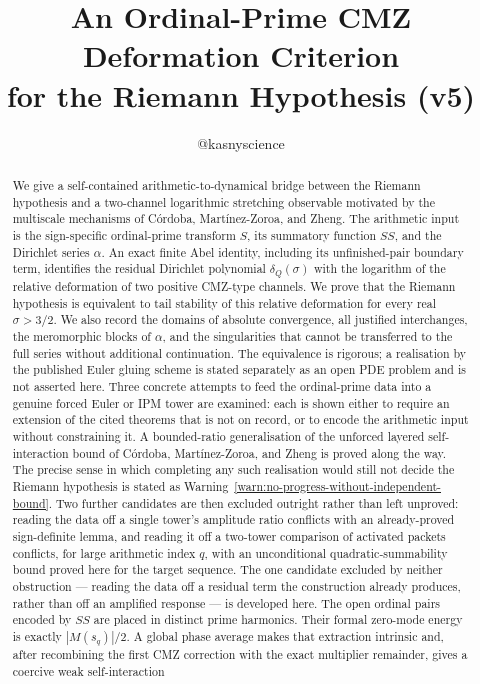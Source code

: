 \documentclass[11pt]{amsart}
\title{An Ordinal-Prime CMZ Deformation Criterion\\
for the Riemann Hypothesis (v5)}
\author{@kasnyscience}
\date{}
\numberwithin{equation}{section}
\theoremstyle{plain}
\theoremstyle{definition}
\theoremstyle{remark}
\begin{document}
\begin{abstract}
We give a self-contained arithmetic-to-dynamical bridge between the Riemann
hypothesis and a two-channel logarithmic stretching observable motivated by
the multiscale mechanisms of C\'ordoba, Mart\'inez-Zoroa, and Zheng.  The
arithmetic input is the sign-specific ordinal-prime transform $S$, its
summatory function $SS$, and the Dirichlet series $\alpha$.  An exact finite
Abel identity, including its unfinished-pair boundary term, identifies the
residual Dirichlet polynomial $\delta_Q(\sigma)$ with the logarithm of the
relative deformation of two positive CMZ-type channels.  We prove that the
Riemann hypothesis is equivalent to tail stability of this relative
deformation for every real $\sigma>3/2$.  We also record the domains of
absolute convergence, all justified interchanges, the meromorphic blocks of
$\alpha$, and the singularities that cannot be transferred to the full
series without additional continuation.  The equivalence is rigorous; a
realisation by the published Euler gluing scheme is stated separately as an
open PDE problem and is not asserted here.  Three concrete attempts to feed
the ordinal-prime data into a genuine forced Euler or IPM tower are examined:
each is shown either to require an extension of the cited theorems that is
not on record, or to encode the arithmetic input without constraining it.  A
bounded-ratio generalisation of the unforced layered self-interaction bound
of C\'ordoba, Mart\'inez-Zoroa, and Zheng is proved along the way.  The
precise sense in which completing any such realisation would still not
decide the Riemann hypothesis is stated as
Warning~\ref{warn:no-progress-without-independent-bound}.  Two further
candidates are then excluded outright rather than left unproved: reading
the data off a single tower's amplitude ratio conflicts with an
already-proved sign-definite lemma, and reading it off a two-tower
comparison of activated packets conflicts, for large arithmetic index $q$,
with an unconditional quadratic-summability bound proved here for the
target sequence.  The one candidate excluded by neither obstruction ---
reading the data off a residual term the construction already produces,
rather than off an amplified response --- is developed here.  The open
ordinal pairs encoded by $SS$ are placed in distinct prime harmonics.  Their
formal zero-mode energy is exactly $|M(s_q)|/2$.  A global phase average makes
that extraction intrinsic and, after recombining the first CMZ correction
with the exact multiplier remainder, gives a coercive weak self-interaction

\end{abstract}
\end{document}
